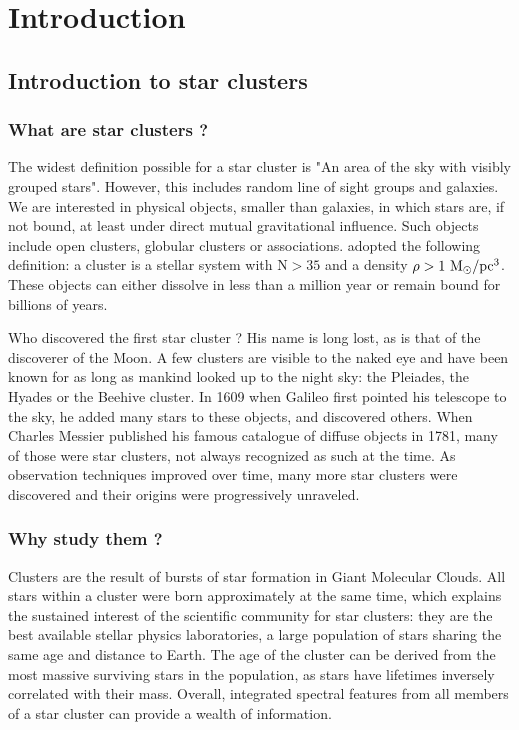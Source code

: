 
\chapter{Introduction}

\newpage

\section{Introduction to star clusters}


\subsection{What are star clusters ? }


The widest definition possible for a star cluster is "An area of the sky with visibly grouped stars". However, this includes random line of sight groups and galaxies. We are interested in physical objects, smaller than galaxies, in which stars are, if not bound, at least under direct mutual gravitational influence. Such objects include open clusters, globular clusters or associations.  \cite{Lada2003} adopted the following definition: a cluster is a stellar system with N$>35$ and a density $\rho > 1~{\textrm{M}_\odot} /\textrm{pc}^3$. These objects can either dissolve in less than a million year or remain bound for billions of years.

Who discovered the first star cluster ? His name is long lost, as is that of the discoverer of the Moon. A few clusters are visible to the naked eye and have been known for as long as mankind looked up to the night sky: the Pleiades, the Hyades or the Beehive cluster. In 1609 when Galileo first pointed his telescope to the sky, he added many stars to these objects, and discovered others. When Charles Messier published his famous catalogue of diffuse objects in 1781, many of those were star clusters, not always recognized as such at the time. As observation techniques improved over time, many more star clusters were discovered and their origins were progressively unraveled.


\subsection{Why study them ?}

Clusters are the result of bursts of star formation in Giant Molecular Clouds. All stars within a cluster were born approximately at the same time, which explains the sustained interest of the scientific community for star clusters: they are the best available stellar physics laboratories, a large population of stars sharing the same age and distance to Earth. The age of the cluster can be derived from the most massive surviving stars in the population, as stars have lifetimes inversely correlated with their mass. Overall, integrated spectral features from all members of a star cluster can provide a wealth of information.

